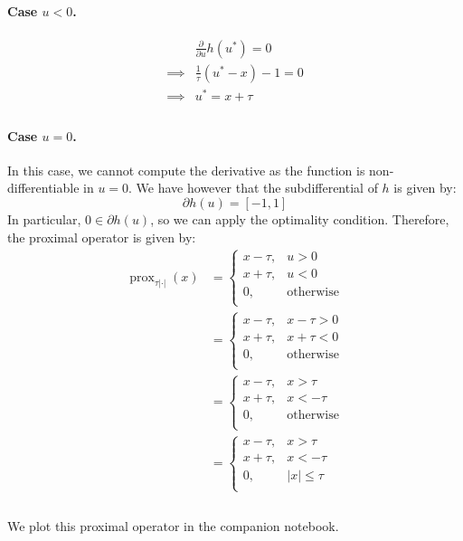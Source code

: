 \documentclass[12pt]{article}
\newcommand{\prox}{\operatorname{prox}}
\begin{document}
\paragraph{Case $u < 0$.}
\begin{align*}
           &
  \frac{\partial}{\partial u}  h(u^*) = 0 \\
  \implies &
  \frac{1}{\tau} (u^*-x) - 1 = 0          \\
  \implies &
  u^* = x + \tau                          \\
\end{align*}

\paragraph{Case $u = 0$.}
In this case, we cannot compute the derivative as the function is non-differentiable in $u = 0$. We have however that the subdifferential of $h$ is given by:
$$
  \partial h(u) = [-1, 1]
$$
In particular, $0 \in \partial h(u)$, so we can apply the optimality condition. Therefore, the proximal operator is given by:
\begin{align*}
  \prox_{\tau |\cdot|}(x)
   & = \begin{cases}
    x - \tau, & u > 0            \\
    x + \tau, & u < 0            \\
    0,        & \text{otherwise} \\
  \end{cases}  \\
   & = \begin{cases}
    x - \tau, & x - \tau > 0     \\
    x + \tau, & x + \tau < 0     \\
    0,        & \text{otherwise} \\
  \end{cases}  \\
   & = \begin{cases}
    x - \tau, & x > \tau         \\
    x + \tau, & x < - \tau       \\
    0,        & \text{otherwise} \\
  \end{cases}  \\
   & = \begin{cases}
    x - \tau, & x > \tau      \\
    x + \tau, & x < -\tau     \\
    0,        & |x| \leq \tau \\
  \end{cases} \\
\end{align*}
\\We plot this proximal operator in the companion notebook.
\end{document}
